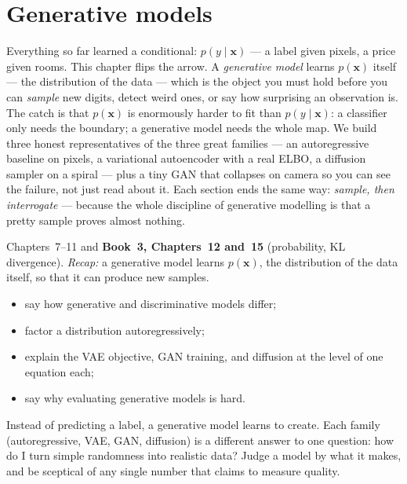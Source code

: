 \chapter{Generative models}
\label{ch:gen}

Everything so far learned a conditional: $p(y \mid \mathbf x)$ --- a
label given pixels, a price given rooms. This chapter flips the arrow.
A \emph{generative model} learns $p(\mathbf x)$
itself --- the distribution of the data --- which is the object you must
hold before you can \emph{sample} new digits, detect weird ones, or say
how surprising an observation is. The catch is that $p(\mathbf x)$ is
enormously harder to fit than $p(y\mid\mathbf x)$: a classifier only
needs the boundary; a generative model needs the whole map. We build
three honest representatives of the three great families --- an
autoregressive baseline on pixels, a variational autoencoder with a
real ELBO, a diffusion sampler on a spiral --- plus a tiny GAN that
collapses on camera so you can see the failure, not just read about it.
Each section ends the same way: \emph{sample, then interrogate} ---
because the whole discipline of generative modelling is that a pretty
sample proves almost nothing.

\begin{rulebox}
Chapters~7--11 and \textbf{Book~3, Chapters~12 and~15} (probability, KL divergence). \emph{Recap:} a generative model learns $p(\mathbf x)$, the distribution of the data itself, so that it can produce new samples.
\end{rulebox}
\begin{wins}
\begin{itemize}
\item say how generative and discriminative models differ;
\item factor a distribution autoregressively;
\item explain the VAE objective, GAN training, and diffusion at the level of one equation each;
\item say why evaluating generative models is hard.
\end{itemize}
\end{wins}
\begin{principle}
Instead of predicting a label, a generative model learns to create. Each family (autoregressive, VAE, GAN, diffusion) is a different answer to one question: how do I turn simple randomness into realistic data? Judge a model by what it makes, and be sceptical of any single number that claims to measure quality.
\end{principle}

